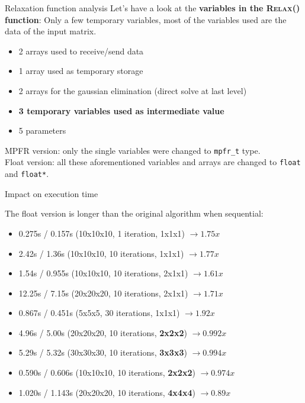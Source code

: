 \documentclass{beamer}
\begin{document}
\begin{frame}{Relaxation function analysis}
  Let's have a look at the \textbf{variables in the \textsc{Relax}() function}:
  Only a few temporary variables, most of the variables used are the data of the input matrix.
  \begin{itemize}
    \item 2 arrays used to receive/send data
    \item 1 array used as temporary storage
    \item 2 arrays for the gaussian elimination (direct solve at last level)
    \item \textbf{3 temporary variables used as intermediate value}
    \item 5 parameters
   \end{itemize}
   MPFR version: only the single variables were changed to \texttt{mpfr\_t} type.\\
   Float version: all these aforementioned variables and arrays are changed to \texttt{float} and \texttt{float*}.
\end{frame}

\begin{frame}{Impact on execution time}
 
 The float version is longer than the original algorithm when sequential:\\
 \begin{itemize}
  \item 0.275s / 0.157s (10x10x10, 1 iteration, 1x1x1) $\rightarrow 1.75x$
  \item 2.42s / 1.36s (10x10x10, 10 iterations, 1x1x1) $\rightarrow 1.77x$
  \item 1.54s / 0.955s (10x10x10, 10 iterations, 2x1x1) $\rightarrow 1.61x$
  \item 12.25s / 7.15s (20x20x20, 10 iterations, 2x1x1) $\rightarrow 1.71x$
  \item 0.867s / 0.451s (5x5x5, 30 iterations, 1x1x1) $\rightarrow 1.92x$
  \item 4.96s / 5.00s (20x20x20, 10 iterations, \textbf{2x2x2})  $\rightarrow 0.992x$
  \item 5.29s / 5.32s (30x30x30, 10 iterations, \textbf{3x3x3})  $\rightarrow 0.994x$
  \item 0.590s / 0.606s (10x10x10, 10 iterations, \textbf{2x2x2})  $\rightarrow 0.974x$
  \item 1.020s / 1.143s (20x20x20, 10 iterations, \textbf{4x4x4})  $\rightarrow 0.89x$
 \end{itemize}
\end{frame}
\end{document}
